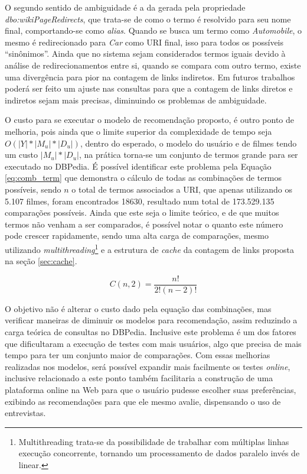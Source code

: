 O segundo sentido de ambiguidade é a da gerada pela propriedade \textit{dbo:wikiPageRedirects}, que trata-se de como o termo é resolvido para seu nome final, comportando-se como \textit{alias}. Quando se busca um termo como \textit{Automobile}, o mesmo é redirecionado para \textit{Car} como \ac{URI} final, isso para todos os possíveis \enquote{sinônimos}. Ainda que no sistema sejam considerados termos iguais devido à análise de redirecionamentos entre si, quando se compara com outro termo, existe uma divergência para pior na contagem de links indiretos. Em futuros trabalhos poderá ser feito um ajuste nas consultas para que a contagem de links diretos e indiretos sejam mais precisas, diminuindo os problemas de ambiguidade.

O custo para se executar o modelo de recomendação proposto, é outro ponto de melhoria, pois ainda que o limite superior da complexidade de tempo seja $O(|Y| * |M_u| * |D_u|)$, dentro do esperado, o modelo do usuário e de filmes tendo um custo $|M_u| * |D_u|$, na prática torna-se um conjunto de termos grande para ser executado no DBPedia. É possível identificar este problema pela Equação \ref{eq:comb_term} que demonstra o cálculo de todas as combinações de termos possíveis, sendo $n$ o total de termos associados a \ac{URI}, que apenas utilizando os 5.107 filmes, foram encontrados 18630, resultado num total de 173.529.135 comparações possíveis. Ainda que este seja o limite teórico, e de que muitos termos não venham a ser comparados, é possível notar o quanto este número pode crescer rapidamente, sendo uma alta carga de comparações, mesmo utilizando \textit{multithreading}\footnote{Multithreading trata-se da possibilidade de trabalhar com múltiplas linhas execução concorrente, tornando um processamento de dados paralelo invés de linear.} e a estrutura de \textit{cache} da contagem de links proposta na seção \ref{sec:cache}.

\begin{equation}
	C(n, 2) = \frac{n!}{2!(n - 2)!}
\label{eq:comb_term}
\end{equation}

O objetivo não é alterar o custo dado pela equação das combinações, mas verificar maneiras de diminuir os modelos para recomendação, assim reduzindo a carga teórica de consultas no DBPedia. Inclusive este problema é um dos fatores que dificultaram a execução de testes com mais usuários, algo que precisa de mais tempo para ter um conjunto maior de comparações. Com essas melhorias realizadas nos modelos, será possível expandir mais facilmente os testes \textit{online}, inclusive relacionado a este ponto também facilitaria a construção de uma plataforma online na Web para que o usuário pudesse escolher suas preferências, exibindo as recomendações para que ele mesmo avalie, dispensando o uso de entrevistas.

